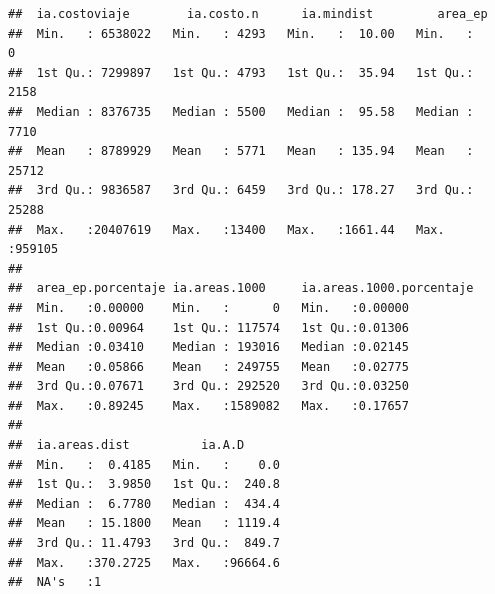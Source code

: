 \documentclass[12pt,]{book}
\begin{document}
\begin{verbatim}
##  ia.costoviaje        ia.costo.n      ia.mindist         area_ep      
##  Min.   : 6538022   Min.   : 4293   Min.   :  10.00   Min.   :     0  
##  1st Qu.: 7299897   1st Qu.: 4793   1st Qu.:  35.94   1st Qu.:  2158  
##  Median : 8376735   Median : 5500   Median :  95.58   Median :  7710  
##  Mean   : 8789929   Mean   : 5771   Mean   : 135.94   Mean   : 25712  
##  3rd Qu.: 9836587   3rd Qu.: 6459   3rd Qu.: 178.27   3rd Qu.: 25288  
##  Max.   :20407619   Max.   :13400   Max.   :1661.44   Max.   :959105  
##                                                                       
##  area_ep.porcentaje ia.areas.1000     ia.areas.1000.porcentaje
##  Min.   :0.00000    Min.   :      0   Min.   :0.00000         
##  1st Qu.:0.00964    1st Qu.: 117574   1st Qu.:0.01306         
##  Median :0.03410    Median : 193016   Median :0.02145         
##  Mean   :0.05866    Mean   : 249755   Mean   :0.02775         
##  3rd Qu.:0.07671    3rd Qu.: 292520   3rd Qu.:0.03250         
##  Max.   :0.89245    Max.   :1589082   Max.   :0.17657         
##                                                               
##  ia.areas.dist          ia.A.D       
##  Min.   :  0.4185   Min.   :    0.0  
##  1st Qu.:  3.9850   1st Qu.:  240.8  
##  Median :  6.7780   Median :  434.4  
##  Mean   : 15.1800   Mean   : 1119.4  
##  3rd Qu.: 11.4793   3rd Qu.:  849.7  
##  Max.   :370.2725   Max.   :96664.6  
##  NA's   :1
\end{verbatim}
\end{document}
